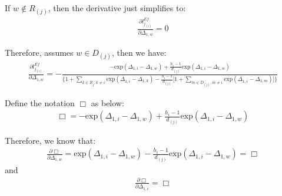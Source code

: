 \documentclass[]{article}
\begin{document}
If \(w \notin R_{(j)}\), then the derivative just simplifies to:
\begin{equation}\begin{aligned}\label{eqn:Efron6}
\frac{\partial l_{j_{(i)}}^{Ef}}{\partial \Delta_{1,w}} = 0
\end{aligned}\end{equation}

Therefore, assumes \(w \in D_{(j)}\), then we have:
\begin{equation}\begin{aligned}\label{eqn:Efron7}
\frac{\partial l_{j_{(i)}}^{Ef}}{\partial \Delta_{1,w}} = -\frac{-\text{exp}(\Delta_{1,i}-\Delta_{1,w})+\frac{h_i-1}{d_{(j)}}\text{exp}(\Delta_{1,i}-\Delta_{1,w})}{\bigg\{1+\sum_{k\in R_j, k\neq i}\text{exp}(\Delta_{1,i}-\Delta_{1,k})-\frac{h_i-1}{d_{(j)}}\big[1+\sum_{m\in D_{(j)}, m\neq i}\text{exp}(\Delta_{1,i}-\Delta_{1,m})\big]\bigg\}}
\end{aligned}\end{equation}

Define the notation \(\Box\) as below:
\begin{equation}\begin{aligned}\label{eqn:DefEfron1}
\Box = -\text{exp}(\Delta_{1,i}-\Delta_{1,w})+\frac{h_i-1}{d_{(j)}}\text{exp}(\Delta_{1,i}-\Delta_{1,w})
\end{aligned}\end{equation}

Therefore, we know that:
\begin{equation}\begin{aligned}\label{eqn:DefEfron1know}
\frac{\partial\Box}{\partial\Delta_{1,w}}=\text{exp}(\Delta_{1,i}-\Delta_{1,w})-\frac{h_i-1}{d_{(j)}}\text{exp}(\Delta_{1,i}-\Delta_{1,w}) = \Box
\end{aligned}\end{equation} and
\begin{equation}\begin{aligned}\label{eqn:DefEfron1know2}
\frac{\partial\Box}{\partial\Delta_{1,i}}=\Box
\end{aligned}\end{equation}
\end{document}
